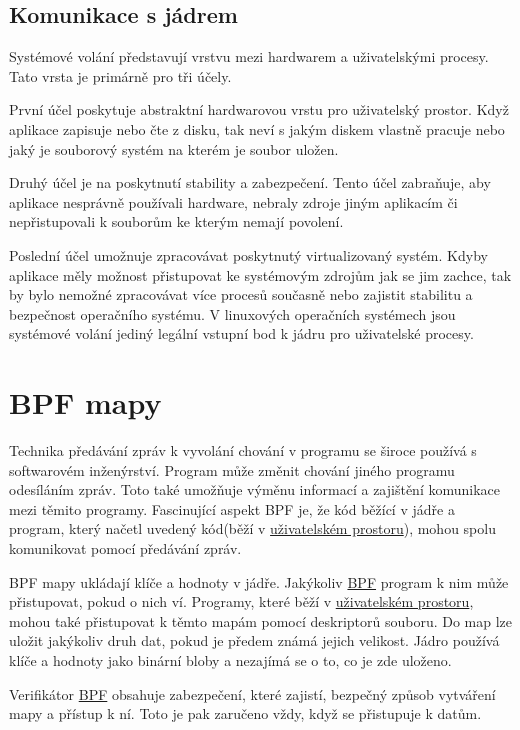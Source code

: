 \subsection*{Komunikace s jádrem}

Systémové volání představují vrstvu mezi hardwarem a uživatelskými procesy. Tato vrsta je primárně pro tři účely.

První účel poskytuje
abstraktní hardwarovou vrstu pro uživatelský prostor. Když aplikace zapisuje nebo čte z disku, tak neví s jakým diskem vlastně pracuje
nebo jaký je souborový systém na kterém je soubor uložen.

Druhý účel je na poskytnutí stability a zabezpečení. Tento účel zabraňuje, aby
aplikace nesprávně používali hardware, nebraly zdroje jiným aplikacím či nepřistupovali k souborům ke kterým nemají povolení.

Poslední účel umožnuje zpracovávat poskytnutý virtualizovaný systém. Kdyby aplikace měly možnost přistupovat ke systémovým zdrojům jak se jim zachce,
tak by bylo nemožné zpracovávat více procesů současně nebo zajistit stabilitu a bezpečnost operačního systému. V linuxových operačních
systémech jsou systémové volání jediný legální vstupní bod k jádru pro uživatelské procesy.

\section{BPF mapy}
\label{sec:BpfMapy}

Technika předávání zpráv k vyvolání chování v programu se široce používá s softwarovém inženýrství. Program může změnit chování jiného programu odesíláním zpráv. Toto také umožňuje výměnu informací a zajištění komunikace mezi těmito programy. Fascinující aspekt BPF je, že kód běžící v jádře a program, který načetl uvedený kód(běží v \hyperref[sec:UzivatelskeProcesy]{uživatelském prostoru}), mohou spolu komunikovat pomocí předávání zpráv.

BPF mapy\cite{LinuxObservabilityWithBpf} ukládají klíče a hodnoty v jádře. Jakýkoliv \hyperref[sec:BPF]{BPF} program k nim může přistupovat, pokud o nich ví. Programy, které běží v \hyperref[sec:UzivatelskeProcesy]{uživatelském prostoru}, mohou také přistupovat k těmto mapám pomocí deskriptorů souboru. Do map lze uložit jakýkoliv druh dat, pokud je předem známá jejich velikost. Jádro používá klíče a hodnoty jako binární bloby a nezajímá se o to, co je zde uloženo.

Verifikátor \hyperref[sec:BPF]{BPF} obsahuje zabezpečení, které zajistí, bezpečný způsob vytváření mapy a přístup k ní. Toto je pak zaručeno vždy, když se přistupuje k datům.


